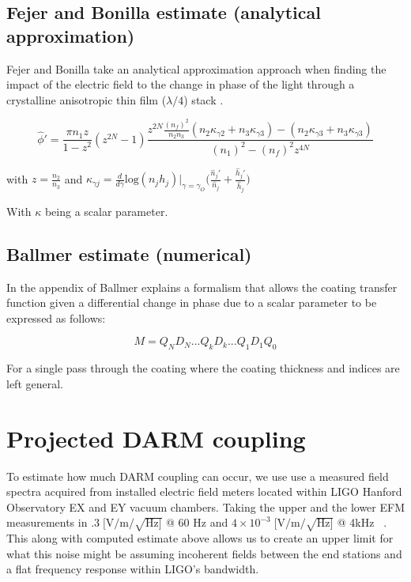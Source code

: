 \subsection{Fejer and Bonilla estimate (analytical approximation)}
Fejer and Bonilla take an analytical approximation approach when finding the impact of the electric field to the change in phase of the light through a crystalline anisotropic thin film ($\lambda/4$) stack \cite{bonilla_fejer}.

\begin{equation}
\hat{\phi}' = \frac{\pi n_1 z}{1-z^2}(z^{2N} -1) \frac{z^{2N} \frac{(n_f)^2}{n_2 n_3}(n_2 \kappa_{\gamma 2} + n_3\kappa_{\gamma 3}) - (n_2 \kappa_{\gamma 3} + n_3\kappa_{\gamma 3})}{(n_1)^2 -(n_f)^2 z^{4N}}
\end{equation}

with $z = \frac{n_2}{n_3}$
and
$
\kappa_{\gamma j} = \frac{d}{d \gamma} \mathrm{log}(n_j h_j)|_{\gamma =\gamma_{O}} \bigg(\frac{\hat{n}_j'}{\hat{n}_j} +\frac{\hat{h}_j'}{\hat{h}_j} \bigg)
$

With $\kappa$ being a scalar parameter.


\subsection{Ballmer estimate (numerical)}

In the appendix of \cite{ballmer2015} Ballmer explains a formalism that allows the coating transfer function given a differential change in phase due to a scalar parameter to be expressed as follows:

\begin{equation}
M = Q_N D_N ...Q_kD_k...Q_1D_1Q_0
\end{equation}

For a single pass through the coating where the coating thickness and indices are left general.


\section{Projected DARM coupling}
To estimate how much DARM coupling can occur, we use use a measured field spectra acquired from installed electric field meters located within LIGO Hanford Observatory EX and EY vacuum chambers. Taking the upper and the lower EFM measurements in $.3\; [\mathrm{V}/\mathrm{m}/\sqrt{\mathrm{Hz}]}$ @ 60 Hz and $4\times10^{-3}\; [\mathrm{V}/\mathrm{m}/\sqrt{\mathrm{Hz}]}$ @ 4kHz ~\cite{efm_log}.
This along with computed estimate above allows us to create an upper limit for what this noise might be assuming incoherent fields between the end stations and a flat frequency response within LIGO's bandwidth.

